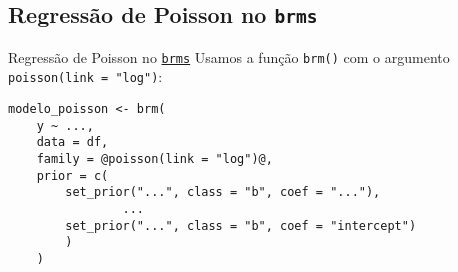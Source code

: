 \subsection{Regressão de Poisson no \texttt{brms}}
\begin{frame}[fragile]{Regressão de Poisson no \href{https://paul-buerkner.github.io/brms/}{\texttt{brms}}}
	Usamos a função \texttt{brm()} com o argumento \texttt{poisson(link = "log")}:
	\vfill
	\begin{lstlisting}[basicstyle=\small]
    modelo_poisson <- brm(
    y ~ ...,
    data = df,
    family = @poisson(link = "log")@,
    prior = c(
        set_prior("...", class = "b", coef = "..."),
                ...
        set_prior("...", class = "b", coef = "intercept")
        )
    )
    \end{lstlisting}
\end{frame}
